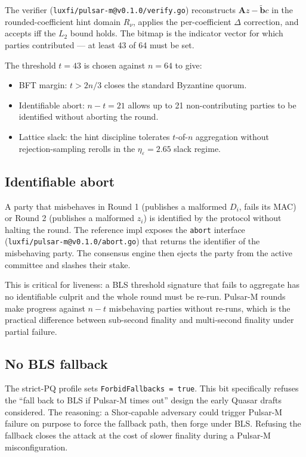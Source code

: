 The verifier (\texttt{luxfi/pulsar-m@v0.1.0/verify.go}) reconstructs
$\mathbf{A} z - \tilde{\mathbf{b}} c$ in the rounded-coefficient hint domain
$R_\nu$, applies the per-coefficient $\Delta$ correction, and accepts iff the
$L_2$ bound holds. The bitmap is the indicator vector for which parties
contributed --- at least 43 of 64 must be set.

The threshold $t=43$ is chosen against $n=64$ to give:

\begin{itemize}[leftmargin=2em,nosep]
  \item BFT margin: $t > 2n/3$ closes the standard Byzantine quorum.
  \item Identifiable abort: $n - t = 21$ allows up to 21 non-contributing
    parties to be identified without aborting the round.
  \item Lattice slack: the hint discipline tolerates $t$-of-$n$ aggregation
    without rejection-sampling rerolls in the $\eta_\varepsilon = 2.65$ slack
    regime.
\end{itemize}

\subsection{Identifiable abort}

A party that misbehaves in Round 1 (publishes a malformed $D_i$, fails its
MAC) or Round 2 (publishes a malformed $z_i$) is identified by the protocol
without halting the round. The reference impl exposes the
\texttt{abort} interface (\texttt{luxfi/pulsar-m@v0.1.0/abort.go}) that
returns the identifier of the misbehaving party. The consensus engine then
ejects the party from the active committee and slashes their stake.

This is critical for liveness: a BLS threshold signature that fails to
aggregate has no identifiable culprit and the whole round must be re-run.
Pulsar-M rounds make progress against $n - t$ misbehaving parties without
re-runs, which is the practical difference between sub-second finality and
multi-second finality under partial failure.

\subsection{No BLS fallback}

The strict-PQ profile sets \texttt{ForbidFallbacks = true}. This bit
specifically refuses the ``fall back to BLS if Pulsar-M times out'' design
the early Quasar drafts considered. The reasoning: a Shor-capable adversary
could trigger Pulsar-M failure on purpose to force the fallback path, then
forge under BLS. Refusing the fallback closes the attack at the cost of
slower finality during a Pulsar-M misconfiguration.

